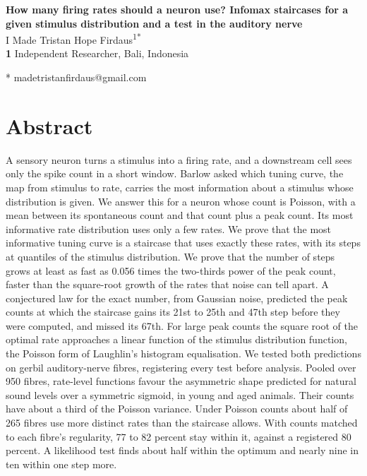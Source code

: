\documentclass[10pt,letterpaper]{article}
\begin{document}
\vspace*{0.2in}

\begin{flushleft}
{\Large
\textbf{How many firing rates should a neuron use? Infomax staircases for a given stimulus distribution and a test in the auditory nerve}
}
\newline
\\
I Made Tristan Hope Firdaus\textsuperscript{1*}
\\
\bigskip
\textbf{1} Independent Researcher, Bali, Indonesia
\\
\bigskip

* madetristanfirdaus@gmail.com
\end{flushleft}

\section*{Abstract}
A sensory neuron turns a stimulus into a firing rate, and a downstream cell sees only the spike count in a short window. Barlow asked which tuning curve, the map from stimulus to rate, carries the most information about a stimulus whose distribution is given. We answer this for a neuron whose count is Poisson, with a mean between its spontaneous count and that count plus a peak count. Its most informative rate distribution uses only a few rates. We prove that the most informative tuning curve is a staircase that uses exactly these rates, with its steps at quantiles of the stimulus distribution. We prove that the number of steps grows at least as fast as 0.056 times the two-thirds power of the peak count, faster than the square-root growth of the rates that noise can tell apart. A conjectured law for the exact number, from Gaussian noise, predicted the peak counts at which the staircase gains its 21st to 25th and 47th step before they were computed, and missed its 67th. For large peak counts the square root of the optimal rate approaches a linear function of the stimulus distribution function, the Poisson form of Laughlin's histogram equalisation. We tested both predictions on gerbil auditory-nerve fibres, registering every test before analysis. Pooled over 950 fibres, rate-level functions favour the asymmetric shape predicted for natural sound levels over a symmetric sigmoid, in young and aged animals. Their counts have about a third of the Poisson variance. Under Poisson counts about half of 265 fibres use more distinct rates than the staircase allows. With counts matched to each fibre's regularity, 77 to 82 percent stay within it, against a registered 80 percent. A likelihood test finds about half within the optimum and nearly nine in ten within one step more.
\end{document}
